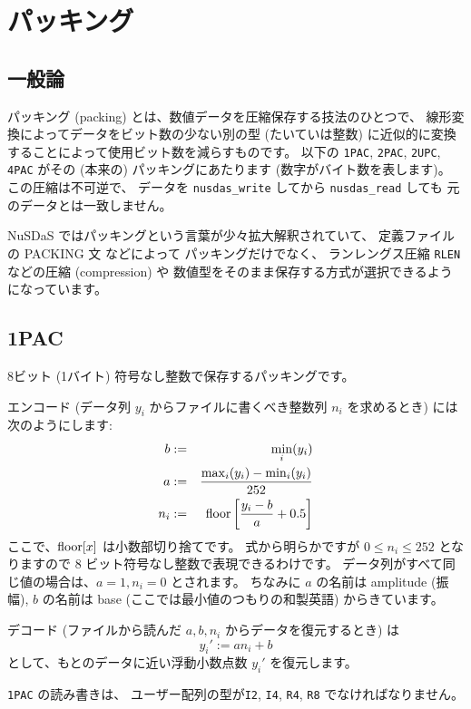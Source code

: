 \chapter{パッキング}
\label{chap:packing}
\section{一般論}

パッキング (packing) とは、数値データを圧縮保存する技法のひとつで、
線形変換によってデータをビット数の少ない別の型
(たいていは整数) に近似的に変換することによって使用ビット数を減らすものです。
以下の {\tt 1PAC}, {\tt 2PAC}, {\tt 2UPC}, {\tt 4PAC}
がその (本来の) パッキングにあたります (数字がバイト数を表します)。
この圧縮は不可逆で、
データを {\tt nusdas\_write} してから {\tt nusdas\_read} しても
元のデータとは一致しません。

NuSDaS ではパッキングという言葉が少々拡大解釈されていて、
定義ファイルの PACKING 文  などによって
パッキングだけでなく、
ランレングス圧縮 {\tt RLEN} などの圧縮 (compression) や
数値型をそのまま保存する方式が選択できるようになっています。


\section{1PAC}

8ビット (1バイト) 符号なし整数で保存するパッキングです。

エンコード (データ列 $y_i$ からファイルに書くべき整数列 $n_i$ を求めるとき)
には次のようにします:
\begin{eqnarray}
b &:=& \min_i(y_i) \\
a &:=& \frac{\max_i(y_i) - \min_i(y_i)}{252} \\
n_i &:=& {\rm floor}\left[\frac{y_i - b}{a} + 0.5\right]
\end{eqnarray}
ここで、${\rm floor}[x]$ は小数部切り捨てです。
式から明らかですが $0 \le n_i \le 252$ となりますので
8 ビット符号なし整数で表現できるわけです。
データ列がすべて同じ値の場合は、$a=1, n_i = 0$ とされます。
ちなみに $a$ の名前は amplitude (振幅), $b$ の名前は
base (ここでは最小値のつもりの和製英語) からきています。

デコード (ファイルから読んだ $a, b, n_i$ からデータを復元するとき) は
\begin{equation}
y_i' := a n_i + b
\end{equation}
として、もとのデータに近い浮動小数点数 $y_i'$ を復元します。

{\tt 1PAC} の読み書きは、
ユーザー配列の型が{\tt I2}, {\tt I4}, {\tt R4}, {\tt R8} でなければなりません。

